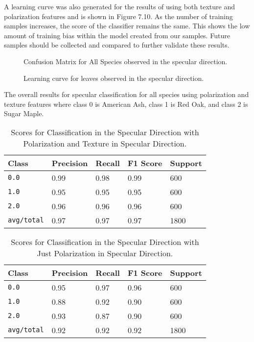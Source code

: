A learning curve was also generated for the results of using both texture and polarization features and is shown in Figure 7.10.  As the number of training samples increases, the score of the classifier remains the same.  This shows the low amount of training bias within the model created from our samples. Future samples should be collected and compared to further validate these results.
%
\begin{figure}
    \begin{center}
    \end{center}
    \caption{Confusion Matrix for All Species observed in the specular direction.}
    \label{fig:polarization}
\end{figure}
%
%
\begin{figure}
    \begin{center}
    \end{center}
    \caption{Learning curve for leaves observed in the specular direction.}
    \label{fig:polarization}
\end{figure}
%
The overall results for specular classification for all species using polarization and texture features where class 0 is American Ash, class 1 is Red Oak, and class 2 is Sugar Maple.
%
\begin{table}
  \centering
  \begin{tabular}{lllll}
    \toprule
    \textbf{Class} & \textbf{Precision} & \textbf{Recall} & \textbf{F1 Score} & \textbf{Support} \\
    \midrule
      \texttt{0.0} & 0.99 & 0.98 & 0.99 & 600 \\
      \texttt{1.0} & 0.95 & 0.95 & 0.95 & 600 \\
      \texttt{2.0} & 0.96 & 0.96 & 0.96 & 600 \\
      \texttt{avg/total} & 0.97 & 0.97 & 0.97 & 1800 \\
    \bottomrule
  \end{tabular}
  \caption{%
    Scores for Classification in the Specular Direction with Polarization and Texture in Specular Direction.
  }
  \label{tab:Packages}
\end{table}
\begin{table}
  \centering
  \begin{tabular}{lllll}
    \toprule
    \textbf{Class} & \textbf{Precision} & \textbf{Recall} & \textbf{F1 Score} & Support\\
    \midrule
      \texttt{0.0} & 0.95 & 0.97 & 0.96 & 600 \\
      \texttt{1.0} & 0.88 & 0.92 & 0.90 & 600 \\
      \texttt{2.0} & 0.93 & 0.87 & 0.90 & 600 \\
      \texttt{avg/total} & 0.92 & 0.92 & 0.92 & 1800 \\
    \bottomrule
  \end{tabular}
  \caption{%
    Scores for Classification in the Specular Direction with Just Polarization in Specular Direction.
  }
  \label{tab:Packages}
\end{table}
